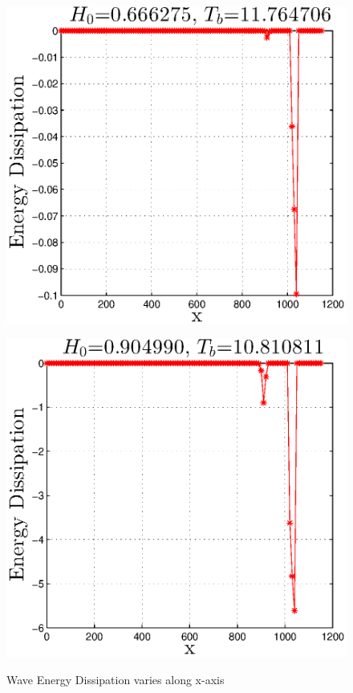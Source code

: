 \begin{figure}[h]
\begin{minipage}[b]{0.47\linewidth}
\centering
\includegraphics[width=\textwidth]{forward_plot/p1_7.eps}
\label{FigE_1}
\end{minipage}
\hspace{0.4cm}
\begin{minipage}[b]{0.47\linewidth}
\centering
\includegraphics[width=\textwidth]{forward_plot/p2_7.eps}
\label{FigE_2}
\end{minipage}
\caption{Wave Energy Dissipation varies along x-axis}
\end{figure}